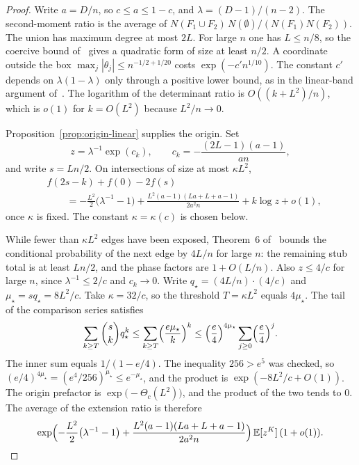 \documentclass[11pt]{article}
\newcommand{\EE}{\mathbb{E}}
\begin{document}
\begin{proof}
Write \(a=D/n\), so \(c\le a\le 1-c\), and \(\lambda=(D-1)/(n-2)\).
The second-moment ratio is the average of
\(N(F_1\cup F_2)\,N(\emptyset)/(N(F_1)N(F_2))\).
The union has maximum degree at most \(2L\). For large \(n\) one has \(L\le n/8\),
so the coercive bound of~\cite{PlusOneV1} gives a quadratic form of size at
least \(n/2\). A coordinate outside the box
\(\max_j|\theta_j|\le n^{-1/2+1/20}\) costs \(\exp(-c' n^{1/10})\).
The constant \(c'\) depends on \(\lambda(1-\lambda)\) only through a positive lower
bound, as in the linear-band argument of~\cite{PlusOneV1}.
The logarithm of the determinant ratio is \(O((k+L^2)/n)\), which is \(o(1)\)
for \(k=O(L^2)\) because \(L^2/n\to 0\).

Proposition~\ref{prop:origin-linear} supplies the origin. Set
\[
z=\lambda^{-1}\exp(c_k),
\qquad
c_k=-\frac{(2L-1)(a-1)}{an},
\]
and write \(s=Ln/2\). On intersections of size at most \(\kappa L^2\),
\[
\begin{aligned}
&f(2s-k)+f(0)-2f(s)\\
&\qquad=
-\frac{L^2}{2}\bigl(\lambda^{-1}-1\bigr)
+\frac{L^2(a-1)(La+L+a-1)}{2a^2 n}
+k\log z
+o(1),
\end{aligned}
\]
once \(\kappa\) is fixed. The constant \(\kappa=\kappa(c)\) is chosen below.

While fewer than \(\kappa L^2\) edges have been exposed, Theorem~6
of~\cite{Gao20} bounds the conditional probability of the next edge by
\(4L/n\) for large \(n\): the remaining stub total is at least \(Ln/2\), and
the phase factors are \(1+O(L/n)\). Also \(z\le 4/c\) for large \(n\), since
\(\lambda^{-1}\le 2/c\) and \(c_k\to 0\).
Write \(q_{\star}=(4L/n)\cdot(4/c)\) and \(\mu_{\star}=s q_{\star}=8L^2/c\).
Take \(\kappa=32/c\), so the threshold \(T=\kappa L^2\) equals \(4\mu_{\star}\).
The tail of the comparison series satisfies
\[
\sum_{k\ge T}\binom{s}{k}q_{\star}^{k}
\le
\sum_{k\ge T}\Bigl(\frac{e\mu_{\star}}{k}\Bigr)^{k}
\le
\Bigl(\frac{e}{4}\Bigr)^{4\mu_{\star}}
\sum_{j\ge 0}\Bigl(\frac{e}{4}\Bigr)^{j}.
\]
The inner sum equals \(1/(1-e/4)\). The inequality \(256>e^5\) was checked, so
\((e/4)^{4\mu_{\star}}=(e^4/256)^{\mu_{\star}}\le e^{-\mu_{\star}}\), and the
product is \(\exp(-8L^2/c+O(1))\).
The origin prefactor is \(\exp\bigl(-\Theta_c(L^2)\bigr)\), and the product of
the two tends to \(0\).
The average of the extension ratio is therefore
\[
\exp\Bigl(
-\frac{L^2}{2}\bigl(\lambda^{-1}-1\bigr)
+\frac{L^2(a-1)(La+L+a-1)}{2a^2 n}
\Bigr)
\,\EE[z^K]\,(1+o(1)).
\]


\end{proof}
\end{document}
